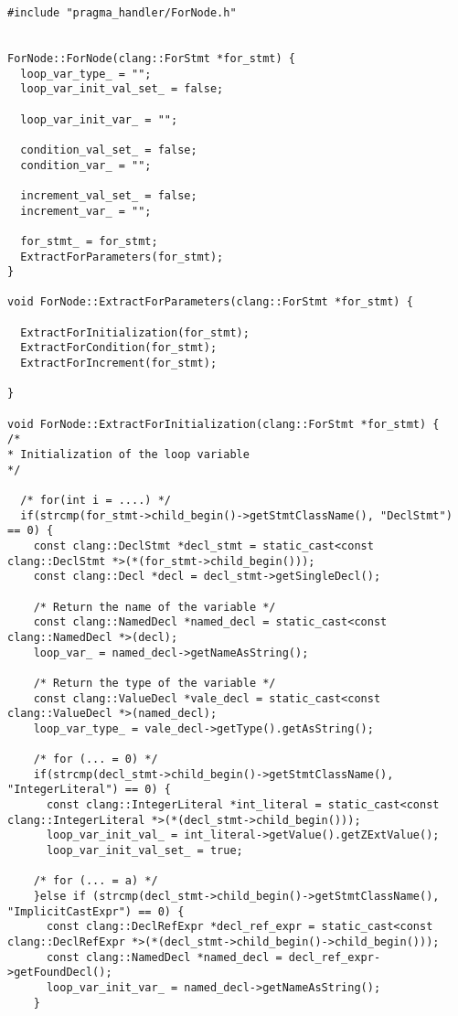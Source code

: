 \documentclass[a4paper,10pt,twoside]{book}
\begin{document}
\begin{lstlisting}[language=CCC, caption=pragma\_handler/ForNode.cpp]
#include "pragma_handler/ForNode.h"


ForNode::ForNode(clang::ForStmt *for_stmt) {
  loop_var_type_ = "";
  loop_var_init_val_set_ = false;

  loop_var_init_var_ = "";

  condition_val_set_ = false;
  condition_var_ = "";

  increment_val_set_ = false;
  increment_var_ = "";

  for_stmt_ = for_stmt;
  ExtractForParameters(for_stmt);
}

void ForNode::ExtractForParameters(clang::ForStmt *for_stmt) {
  
  ExtractForInitialization(for_stmt);
  ExtractForCondition(for_stmt);
  ExtractForIncrement(for_stmt);

}

void ForNode::ExtractForInitialization(clang::ForStmt *for_stmt) {
/*
* Initialization of the loop variable
*/

  /* for(int i = ....) */
  if(strcmp(for_stmt->child_begin()->getStmtClassName(), "DeclStmt") == 0) {
    const clang::DeclStmt *decl_stmt = static_cast<const clang::DeclStmt *>(*(for_stmt->child_begin()));
    const clang::Decl *decl = decl_stmt->getSingleDecl();
    
    /* Return the name of the variable */
    const clang::NamedDecl *named_decl = static_cast<const clang::NamedDecl *>(decl);            
    loop_var_ = named_decl->getNameAsString();
    
    /* Return the type of the variable */  
    const clang::ValueDecl *vale_decl = static_cast<const clang::ValueDecl *>(named_decl);
    loop_var_type_ = vale_decl->getType().getAsString();

    /* for (... = 0) */
    if(strcmp(decl_stmt->child_begin()->getStmtClassName(), "IntegerLiteral") == 0) {      
      const clang::IntegerLiteral *int_literal = static_cast<const clang::IntegerLiteral *>(*(decl_stmt->child_begin())); 
      loop_var_init_val_ = int_literal->getValue().getZExtValue();
      loop_var_init_val_set_ = true;
    
    /* for (... = a) */
    }else if (strcmp(decl_stmt->child_begin()->getStmtClassName(), "ImplicitCastExpr") == 0) {
      const clang::DeclRefExpr *decl_ref_expr = static_cast<const clang::DeclRefExpr *>(*(decl_stmt->child_begin()->child_begin()));
      const clang::NamedDecl *named_decl = decl_ref_expr->getFoundDecl();
      loop_var_init_var_ = named_decl->getNameAsString();
    }


\end{lstlisting}
\end{document}
